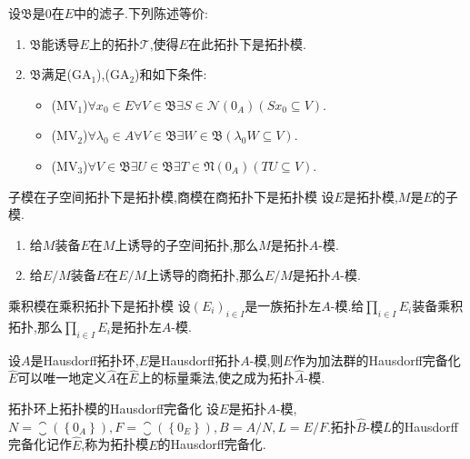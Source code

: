 \begin{proposition}{}{}
	设$\mathfrak{B}$是$0$在$E$中的滤子.下列陈述等价:
	\begin{enumerate}
		\item $\mathfrak{B}$能诱导$E$上的拓扑$\mathcal{T}$,使得$E$在此拓扑下是拓扑模.
		\item $\mathfrak{B}$满足($\mathrm{GA}_{1}$),($\mathrm{GA}_{2}$)和如下条件:
		\begin{itemize}
			\item ($\mathrm{MV}_{1}$)$\forall x_{0}\in E\forall V\in\mathfrak{B}\exists S\in\mathcal{N}\left(0_{A}\right)\left(Sx_{0}\subseteq V\right)$.
			\item ($\mathrm{MV}_{2}$)$\forall \lambda_{0}\in A\forall V\in\mathfrak{B}\exists W\in\mathfrak{B}\left(\lambda_{0}W\subseteq V\right)$.
			\item ($\mathrm{MV}_{3}$)$\forall V\in\mathfrak{B}\exists U\in\mathfrak{B}\exists T\in\mathfrak{N}\left(0_{A}\right)\left(TU\subseteq V\right)$.
		\end{itemize}
	\end{enumerate}
\end{proposition}

\begin{proposition}{子模在子空间拓扑下是拓扑模,商模在商拓扑下是拓扑模}{}
	设$E$是拓扑模,$M$是$E$的子模.
	\begin{enumerate}
		\item 给$M$装备$E$在$M$上诱导的子空间拓扑,那么$M$是拓扑$A$-模.
		\item 给$E/M$装备$E$在$E/M$上诱导的商拓扑,那么$E/M$是拓扑$A$-模.
	\end{enumerate}
\end{proposition}

\begin{proposition}{乘积模在乘积拓扑下是拓扑模}{}
	设$\left(E_{i}\right)_{i\in I}$是一族拓扑左$A$-模.给$\prod\limits_{i\in I}E_{i}$装备乘积拓扑,那么$\prod\limits_{i\in I}E_{i}$是拓扑左$A$-模.
\end{proposition}

\begin{proposition}{}{}
	设$A$是Hausdorff拓扑环,$E$是Hausdorff拓扑$A$-模,则$E$作为加法群的Hausdorff完备化$\hat{E}$可以唯一地定义$\hat{A}$在$\hat{E}$上的标量乘法,使之成为拓扑$\hat{A}$-模.
\end{proposition}

\begin{definition}{拓扑环上拓扑模的Hausdorff完备化}{}
	设$E$是拓扑$A$-模,$N=\closure\left(\left\{0_{A}\right\}\right),F=\closure\left(\left\{0_{E}\right\}\right),B=A/N,L=E/F$.拓扑$\hat{B}$-模$L$的Hausdorff完备化记作$\hat{E}$,称为拓扑模$E$的Hausdorff完备化.
\end{definition}

